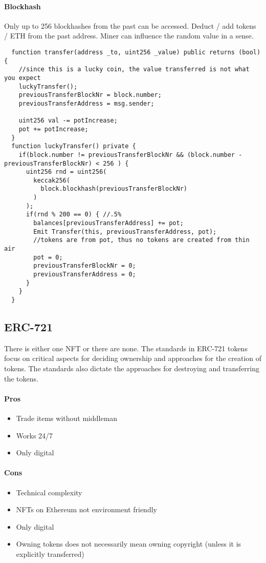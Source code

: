 \paragraph{Blockhash}
Only up to 256 blockhashes from the past can be accessed.
Deduct / add tokens / ETH from the past address.
Miner can influence the random value in a sense.

\begin{lstlisting}
  function transfer(address _to, uint256 _value) public returns (bool) {
    //since this is a lucky coin, the value transferred is not what you expect
    luckyTransfer();
    previousTransferBlockNr = block.number;
    previousTransferAddress = msg.sender;

    uint256 val -= potIncrease;
    pot += potIncrease;
  }
  function luckyTransfer() private {
    if(block.number != previousTransferBlockNr && (block.number - previousTransferBlockNr) < 256 ) {
      uint256 rnd = uint256(
        keccak256(
          block.blockhash(previousTransferBlockNr)
        )
      );
      if(rnd % 200 == 0) { //.5%
        balances[previousTransferAddress] += pot;
        Emit Transfer(this, previousTransferAddress, pot);
        //tokens are from pot, thus no tokens are created from thin air
        pot = 0;
        previousTransferBlockNr = 0;
        previousTransferAddress = 0;
      }
    }
  }
\end{lstlisting}




\subsection{ERC-721}
There is either one NFT or there are none.
The standards in ERC-721 tokens focus on critical aspects for deciding ownership and approaches for the creation of tokens.
The standards also dictate the approaches for destroying and transferring the tokens. 


\paragraph{Pros}
\begin{itemize}
  \item Trade items without middleman
  \item Works 24/7
  \item Only digital
\end{itemize}
\paragraph{Cons}
\begin{itemize}
  \item Technical complexity
  \item NFTs on Ethereum not environment friendly
  \item Only digital
  \item Owning tokens does not necessarily mean owning copyright (unless it is explicitly transferred)
\end{itemize}

